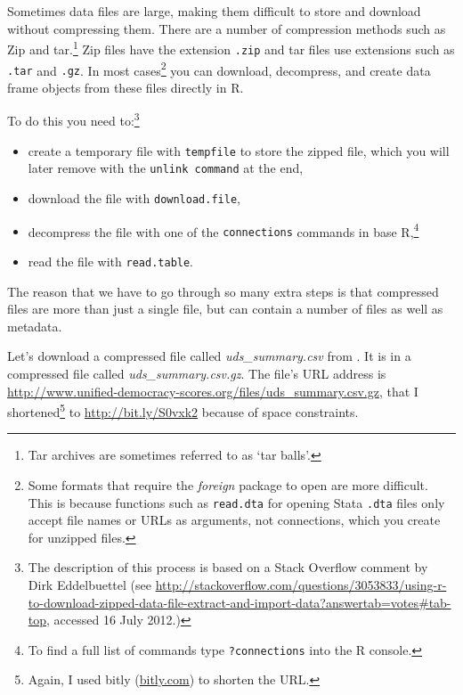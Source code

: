 Sometimes data files are large, making them difficult to store and download without compressing them. There are a number of compression methods such as Zip and tar.\footnote{Tar archives are sometimes referred to as `tar balls'.} Zip files have the extension {\tt{.zip}} and tar files use extensions such as {\tt{.tar}} and {\tt{.gz}}. In most cases\footnote{Some formats that require the {\emph{foreign}} package to open are more difficult. This is because functions such as {\tt{read.dta}} for opening Stata {\tt{.dta}} files only accept file names or URLs as arguments, not connections, which you create for unzipped files.} you can download, decompress, and create data frame objects from these files directly in R. 

To do this you need to:\footnote{The description of this process is based on a Stack Overflow comment by Dirk Eddelbuettel (see {\url{http://stackoverflow.com/questions/3053833/using-r-to-download-zipped-data-file-extract-and-import-data?answertab=votes\#tab-top}}, accessed 16 July 2012.)}

\begin{itemize}
	\item create a temporary file with {\tt{tempfile}} to store the zipped file, which you will later remove with the {\tt{unlink command}} at the end,
	\item download the file with {\tt{download.file}},
	\item decompress the file with one of the {\tt{connections}} commands in base R,\footnote{To find a full list of commands type {\tt{?connections}} into the R console.}
	\item read the file with {\tt{read.table}}. 
\end{itemize}

\noindent The reason that we have to go through so many extra steps is that compressed files are more than just a single file, but can contain a number of files as well as metadata.

Let's download a compressed file called {\emph{uds\_summary.csv}} from \cite{Pemstein2010}. It is in a compressed file called {\emph{uds\_summary.csv.gz}}. The file's URL address is {\url{http://www.unified-democracy-scores.org/files/uds_summary.csv.gz}}, that I shortened\footnote{Again, I used bitly (\url{bitly.com}) to shorten the URL.} to \url{http://bit.ly/S0vxk2} because of space constraints.

